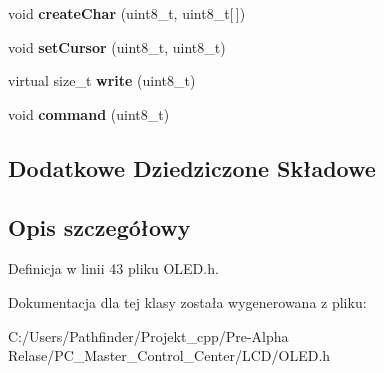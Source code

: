\begin{DoxyCompactItemize}
void {\bfseries create\+Char} (uint8\+\_\+t, uint8\+\_\+t\mbox{[}$\,$\mbox{]})
\item 
\mbox{\label{class_adafruit___character_o_l_e_d_a7fcc36b36db33fdcbb95ddc2ef60c2f3}} 
void {\bfseries set\+Cursor} (uint8\+\_\+t, uint8\+\_\+t)
\item 
\mbox{\label{class_adafruit___character_o_l_e_d_ad22d8b025ce81887cde5cfcce830240d}} 
virtual size\+\_\+t {\bfseries write} (uint8\+\_\+t)
\item 
\mbox{\label{class_adafruit___character_o_l_e_d_ace4dd5d93c634e73067df5d0289e6f0f}} 
void {\bfseries command} (uint8\+\_\+t)
\end{DoxyCompactItemize}
\subsection*{Dodatkowe Dziedziczone Składowe}


\subsection{Opis szczegółowy}


Definicja w linii 43 pliku O\+L\+E\+D.\+h.



Dokumentacja dla tej klasy została wygenerowana z pliku\+:\begin{DoxyCompactItemize}
\item 
C\+:/\+Users/\+Pathfinder/\+Projekt\+\_\+cpp/\+Pre-\/\+Alpha Relase/\+P\+C\+\_\+\+Master\+\_\+\+Control\+\_\+\+Center/\+L\+C\+D/O\+L\+E\+D.\+h\end{DoxyCompactItemize}

